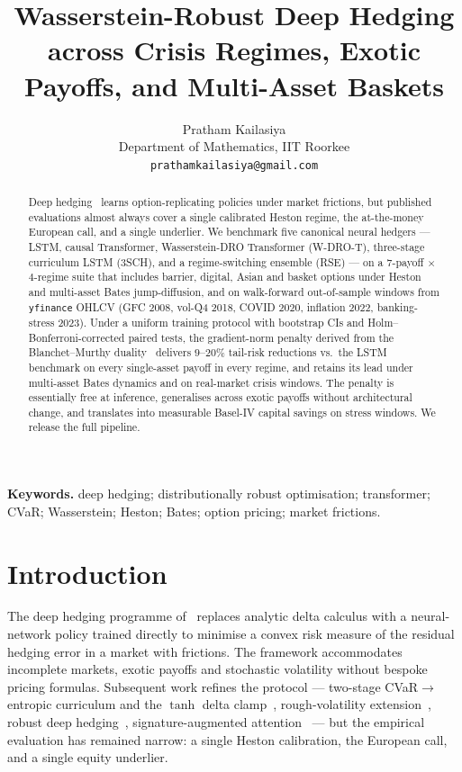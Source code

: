 \documentclass[11pt]{article}
\title{\bfseries Wasserstein-Robust Deep Hedging\\across Crisis Regimes,
       Exotic Payoffs, and Multi-Asset Baskets}
\author{%
  Pratham Kailasiya \\
  Department of Mathematics, IIT Roorkee \\
  \texttt{prathamkailasiya@gmail.com}
}
\date{}
\begin{document}
\maketitle

\begin{abstract}\noindent
Deep hedging~\citep{buehler2019deep} learns option-replicating policies under market frictions, but published evaluations almost always cover a single calibrated Heston regime, the at-the-money European call, and a single underlier.  We benchmark five canonical neural hedgers --- LSTM, causal Transformer, Wasserstein-DRO Transformer (W-DRO-T), three-stage curriculum LSTM (3SCH), and a regime-switching ensemble (RSE) --- on a $7$-payoff $\times$ $4$-regime suite that includes barrier, digital, Asian and basket options under Heston and multi-asset Bates jump-diffusion, and on walk-forward out-of-sample windows from \texttt{yfinance} OHLCV (GFC 2008, vol-Q4 2018, COVID 2020, inflation 2022, banking-stress 2023).  Under a uniform training protocol with bootstrap CIs and Holm--Bonferroni-corrected paired tests, the gradient-norm penalty derived from the Blanchet--Murthy duality~\citep{blanchet2019quantifying} delivers $9$--$20\%$ tail-risk reductions vs.\ the LSTM benchmark on every single-asset payoff in every regime, and retains its lead under multi-asset Bates dynamics and on real-market crisis windows.  The penalty is essentially free at inference, generalises across exotic payoffs without architectural change, and translates into measurable Basel-IV capital savings on stress windows.  We release the full pipeline.
\end{abstract}

\smallskip\noindent\textbf{Keywords.} deep hedging; distributionally robust optimisation; transformer; CVaR; Wasserstein; Heston; Bates; option pricing; market frictions.

\section{Introduction}
\label{sec:intro}

The deep hedging programme of~\citet{buehler2019deep} replaces analytic delta calculus with a neural-network policy trained directly to minimise a convex risk measure of the residual hedging error in a market with frictions.  The framework accommodates incomplete markets, exotic payoffs and stochastic volatility without bespoke pricing formulas.  Subsequent work refines the protocol --- two-stage CVaR$\to$entropic curriculum and the $\tanh$ delta clamp~\citep{kozyra2019deep}, rough-volatility extension~\citep{horvath2021deep}, robust deep hedging~\citep{lutkebohmert2019robust}, signature-augmented attention~\citep{tong2023sigformer} --- but the empirical evaluation has remained narrow: a single Heston calibration, the European call, and a single equity underlier.
\end{document}
